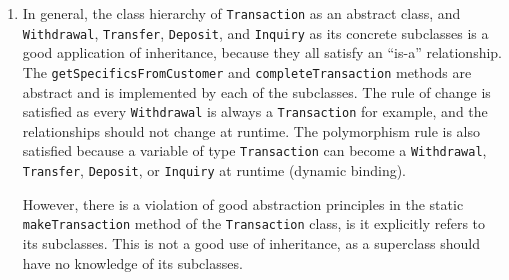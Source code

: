 \documentclass{report}
\begin{document}
\begin{enumerate}
    \item In general, the class hierarchy of \texttt{Transaction} as an
    abstract class, and \\ \texttt{Withdrawal}, \texttt{Transfer},
    \texttt{Deposit}, and \texttt{Inquiry} as its concrete subclasses is a
    good application of inheritance, because they all satisfy an ``is-a''
    relationship. The \texttt{getSpecificsFromCustomer} and
    \texttt{completeTransaction} methods are abstract and is implemented
    by each of the subclasses. The rule of change is satisfied as every
    \texttt{Withdrawal} is always a \texttt{Transaction} for example, and
    the relationships should not change at runtime. The polymorphism rule
    is also satisfied because a variable of type \texttt{Transaction} can
    become a \texttt{Withdrawal}, \texttt{Transfer}, \texttt{Deposit}, or
    \texttt{Inquiry} at runtime (dynamic binding).
    
    However, there is a violation of good abstraction principles in the
    static \\ \texttt{makeTransaction} method of the \texttt{Transaction}
    class, is it explicitly refers to its subclasses. This is not a good use of
    inheritance, as a superclass should have no knowledge of its subclasses.

\end{enumerate}
\end{document}
